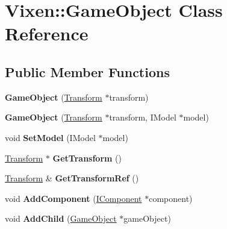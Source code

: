 \hypertarget{class_vixen_1_1_game_object}{}\section{Vixen\+:\+:Game\+Object Class Reference}
\label{class_vixen_1_1_game_object}
\subsection*{Public Member Functions}
\begin{DoxyCompactItemize}
\item 
\hypertarget{class_vixen_1_1_game_object_ab4aa9e92393c2b6ec6563a68febb0479}{}{\bfseries Game\+Object} (\hyperlink{class_vixen_1_1_transform}{Transform} $\ast$transform)\label{class_vixen_1_1_game_object_ab4aa9e92393c2b6ec6563a68febb0479}

\item 
\hypertarget{class_vixen_1_1_game_object_aaa3c7e9feb235493c155136d488652c0}{}{\bfseries Game\+Object} (\hyperlink{class_vixen_1_1_transform}{Transform} $\ast$transform, I\+Model $\ast$model)\label{class_vixen_1_1_game_object_aaa3c7e9feb235493c155136d488652c0}

\item 
\hypertarget{class_vixen_1_1_game_object_a5b8200944e6429f59ce0f97cd74c7d35}{}void {\bfseries Set\+Model} (I\+Model $\ast$model)\label{class_vixen_1_1_game_object_a5b8200944e6429f59ce0f97cd74c7d35}

\item 
\hypertarget{class_vixen_1_1_game_object_ac6fb545940338d77f6a3d76db6626eea}{}\hyperlink{class_vixen_1_1_transform}{Transform} $\ast$ {\bfseries Get\+Transform} ()\label{class_vixen_1_1_game_object_ac6fb545940338d77f6a3d76db6626eea}

\item 
\hypertarget{class_vixen_1_1_game_object_aee56c8350eaac8e27e949584418c363b}{}\hyperlink{class_vixen_1_1_transform}{Transform} \& {\bfseries Get\+Transform\+Ref} ()\label{class_vixen_1_1_game_object_aee56c8350eaac8e27e949584418c363b}

\item 
\hypertarget{class_vixen_1_1_game_object_a5d6175a9a392ea393f0ed01657259c97}{}void {\bfseries Add\+Component} (\hyperlink{class_vixen_1_1_i_component}{I\+Component} $\ast$component)\label{class_vixen_1_1_game_object_a5d6175a9a392ea393f0ed01657259c97}

\item 
\hypertarget{class_vixen_1_1_game_object_a53a3da3db88b66ac6ce884065a760d7a}{}void {\bfseries Add\+Child} (\hyperlink{class_vixen_1_1_game_object}{Game\+Object} $\ast$game\+Object)\label{class_vixen_1_1_game_object_a53a3da3db88b66ac6ce884065a760d7a}


\end{DoxyCompactItemize}
